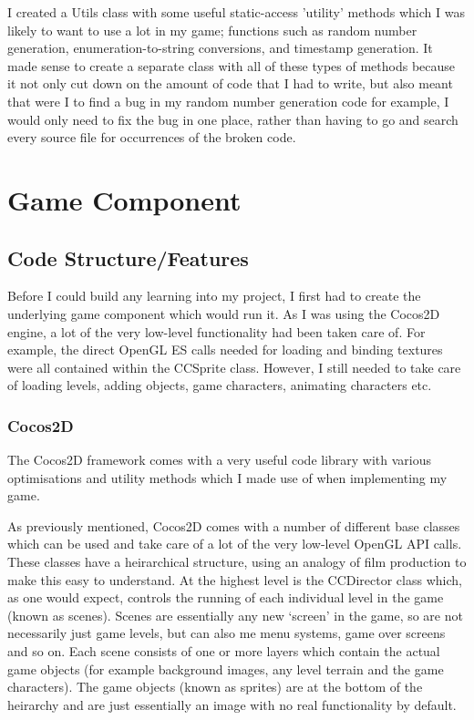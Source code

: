 \documentclass[a4paper,oneside]{report}
\begin{document}
I created a Utils class with some useful static-access 'utility' methods which I was likely to want to use a lot in my game; functions such as random number generation, enumeration-to-string conversions, and timestamp generation. It made sense to create a separate class with all of these types of methods because it not only cut down on the amount of code that I had to write, but also meant that were I to find a bug in my random number generation code for example, I would only need to fix the bug in one place, rather than having to go and search every source file for occurrences of the broken code. 

\chapter{Game Component}
		
\section{Code Structure/Features}

Before I could build any learning into my project, I first had to create the underlying game component which would run it. As I was using the Cocos2D engine, a lot of the very low-level functionality had been taken care of. For example, the direct OpenGL ES calls needed for loading and binding textures were all contained within the CCSprite class. However, I still needed to take care of loading levels, adding objects, game characters, animating characters etc.

\subsection{Cocos2D} 

The Cocos2D framework comes with a very useful code library with various optimisations and utility methods which I made use of when implementing my game.

As previously mentioned, Cocos2D comes with a number of different base classes which can be used and take care of a lot of the very low-level OpenGL API calls. These classes have a heirarchical structure, using an analogy of film production to make this easy to understand. At the highest level is the CCDirector class which, as one would expect, controls the running of each individual level in the game (known as scenes). Scenes are essentially any new `screen' in the game, so are not necessarily just game levels, but can also me menu systems, game over screens and so on. Each scene consists of one or more layers which contain the actual game objects (for example background images, any level terrain and the game characters). The game objects (known as sprites) are at the bottom of the heirarchy and are just essentially an image with no real functionality by default.
\end{document}
